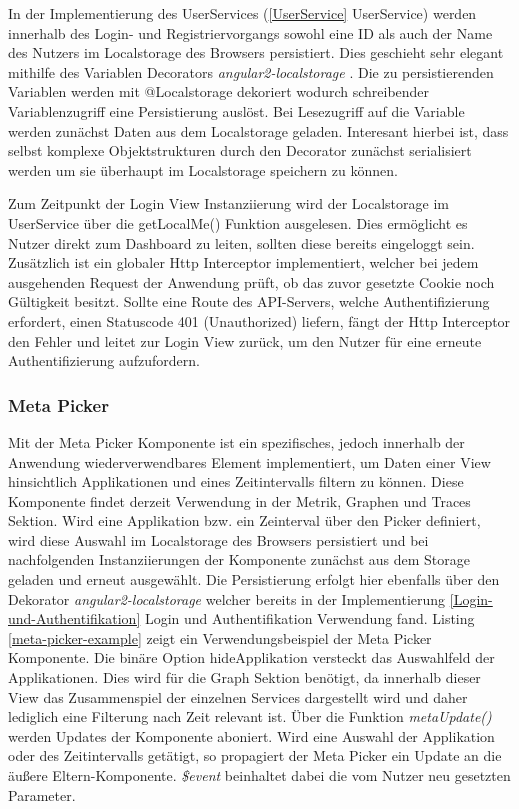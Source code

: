 In der Implementierung des UserServices (\ref{UserService} UserService) werden innerhalb des Login- und Registriervorgangs
sowohl eine ID als auch der Name des Nutzers im Localstorage des Browsers persistiert.
Dies geschieht sehr elegant mithilfe des Variablen Decorators \emph{angular2-localstorage} \cite{marcj95:online}.
Die zu persistierenden Variablen werden mit @Localstorage dekoriert wodurch schreibender Variablenzugriff eine Persistierung auslöst.
Bei Lesezugriff auf die Variable werden zunächst Daten aus dem Localstorage geladen.
Interesant hierbei ist, dass selbst komplexe Objektstrukturen durch den Decorator zunächst serialisiert werden um sie überhaupt im Localstorage speichern zu können.

Zum Zeitpunkt der Login View Instanziierung wird der Localstorage im UserService über die getLocalMe() Funktion ausgelesen.
Dies ermöglicht es Nutzer direkt zum Dashboard zu leiten, sollten diese bereits eingeloggt sein.
Zusätzlich ist ein globaler Http Interceptor implementiert, welcher bei jedem ausgehenden Request der Anwendung prüft, ob das zuvor gesetzte Cookie noch Gültigkeit besitzt.
Sollte eine Route des \ac{API}-Servers, welche Authentifizierung erfordert, einen Statuscode 401 (Unauthorized) liefern,
fängt der Http Interceptor den Fehler und leitet zur Login View zurück, um den Nutzer für eine erneute Authentifizierung aufzufordern.




\subsubsection{Meta Picker}

Mit der Meta Picker Komponente ist ein spezifisches, jedoch innerhalb der Anwendung wiederverwendbares Element implementiert, um Daten einer View hinsichtlich Applikationen und eines Zeitintervalls filtern zu können.
Diese Komponente findet derzeit Verwendung in der Metrik, Graphen und Traces Sektion. Wird eine Applikation bzw. ein Zeinterval über den Picker definiert,
wird diese Auswahl im Localstorage des Browsers persistiert und bei nachfolgenden Instanziierungen der Komponente zunächst aus dem Storage geladen und erneut ausgewählt.
Die Persistierung erfolgt hier ebenfalls über den Dekorator \emph{angular2-localstorage}
welcher bereits in der Implementierung \ref{Login-und-Authentifikation} Login und Authentifikation Verwendung fand.
Listing \ref{meta-picker-example} zeigt ein Verwendungsbeispiel der Meta Picker Komponente.
Die binäre Option hideApplikation versteckt das Auswahlfeld der Applikationen. Dies wird für die Graph Sektion benötigt,
da innerhalb dieser View das Zusammenspiel der einzelnen Services dargestellt wird und daher lediglich eine Filterung nach Zeit relevant ist.
Über die Funktion \emph{metaUpdate()} werden Updates der Komponente aboniert. Wird eine Auswahl der Applikation oder des Zeitintervalls getätigt,
so propagiert der Meta Picker ein Update an die äußere Eltern-Komponente. \emph{\$event} beinhaltet dabei die vom Nutzer neu gesetzten Parameter.


